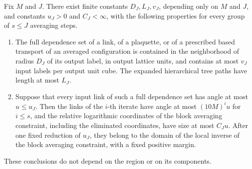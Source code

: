 \begin{lemma}\label{ch18:lem:finite-stencils}
Fix $M$ and $J$. There exist finite constants $D_J,L_J,v_J$, depending only on $M$ and $J$, and constants $u_J>0$ and $C_J<\infty$, with the following properties for every group of $s\le J$ averaging steps.
\begin{enumerate}
\item The full dependence set of a link, of a plaquette, or of a prescribed based transport of an averaged configuration is contained in the neighborhood of radius $D_J$ of its output label, in output lattice units, and contains at most $v_J$ input labels per output unit cube. The expanded hierarchical tree paths have length at most $L_J$.
\item Suppose that every input link of such a full dependence set has angle at most $u\le u_J$. Then the links of the $i$-th iterate have angle at most $(10M)^iu$ for $i\le s$, and the relative logarithmic coordinates of the block averaging constraint, including the eliminated coordinates, have size at most $C_Ju$. After one fixed reduction of $u_J$, they belong to the domain of the local inverse of the block averaging constraint, with a fixed positive margin.
\end{enumerate}
These conclusions do not depend on the region or on its components.
\end{lemma}

